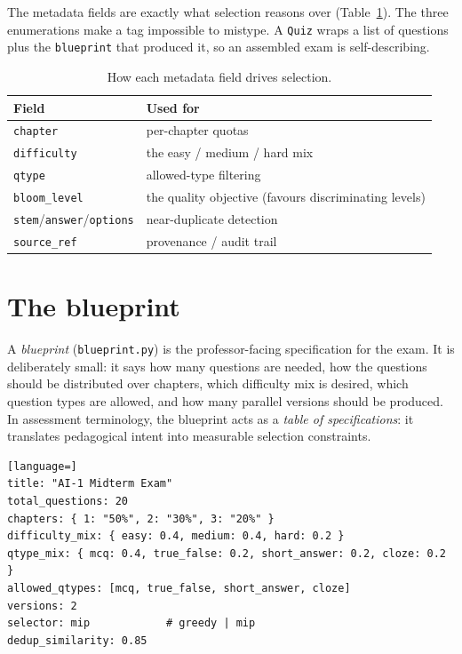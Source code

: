 \documentclass[11pt,a4paper]{article}
\newcommand{\code}[1]{\texttt{\small #1}}
\newcommand{\pkg}[1]{\texttt{\small #1}}
\begin{document}
The metadata fields are exactly what selection reasons over
(Table~\ref{tab:fields}). The three enumerations make a tag impossible to
mistype. A \code{Quiz} wraps a list of questions plus the \code{blueprint} that
produced it, so an assembled exam is self-describing.

\begin{table}[h]
\centering
\caption{How each metadata field drives selection.}
\label{tab:fields}
\small
\begin{tabular}{@{}ll@{}}
\toprule
\textbf{Field} & \textbf{Used for} \\
\midrule
\code{chapter}                & per-chapter quotas \\
\code{difficulty}             & the easy / medium / hard mix \\
\code{qtype}                  & allowed-type filtering \\
\code{bloom\_level}           & the quality objective (favours discriminating levels) \\
\code{stem}/\code{answer}/\code{options} & near-duplicate detection \\
\code{source\_ref}            & provenance / audit trail \\
\bottomrule
\end{tabular}
\end{table}


\section{The blueprint}
\label{sec:blueprint}

A \emph{blueprint} (\pkg{blueprint.py}) is the professor-facing specification
for the exam. It is deliberately small: it says how many questions are needed,
how the questions should be distributed over chapters, which difficulty mix is
desired, which question types are allowed, and how many parallel versions should
be produced. In assessment terminology, the blueprint acts as a \emph{table of
specifications}: it translates pedagogical intent into measurable selection
constraints.

\begin{lstlisting}[language=]
title: "AI-1 Midterm Exam"
total_questions: 20
chapters: { 1: "50%", 2: "30%", 3: "20%" }
difficulty_mix: { easy: 0.4, medium: 0.4, hard: 0.2 }
qtype_mix: { mcq: 0.4, true_false: 0.2, short_answer: 0.2, cloze: 0.2 }
allowed_qtypes: [mcq, true_false, short_answer, cloze]
versions: 2
selector: mip            # greedy | mip
dedup_similarity: 0.85
\end{lstlisting}
\end{document}
